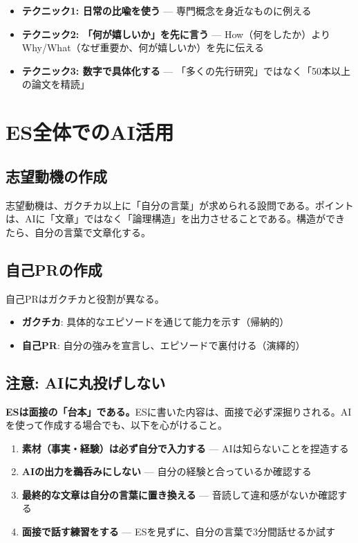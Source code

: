 \begin{itemize}
\item \textbf{テクニック1: 日常の比喩を使う} --- 専門概念を身近なものに例える
\item \textbf{テクニック2: 「何が嬉しいか」を先に言う} --- How（何をしたか）よりWhy/What（なぜ重要か、何が嬉しいか）を先に伝える
\item \textbf{テクニック3: 数字で具体化する} --- 「多くの先行研究」ではなく「50本以上の論文を精読」
\end{itemize}

\section{ES全体でのAI活用}

\subsection*{志望動機の作成}

志望動機は、ガクチカ以上に「自分の言葉」が求められる設問である。ポイントは、AIに「文章」ではなく「論理構造」を出力させることである。構造ができたら、自分の言葉で文章化する。

\subsection*{自己PRの作成}

自己PRはガクチカと役割が異なる。

\begin{itemize}
\item \textbf{ガクチカ}: 具体的なエピソードを通じて能力を示す（帰納的）
\item \textbf{自己PR}: 自分の強みを宣言し、エピソードで裏付ける（演繹的）
\end{itemize}

\subsection*{注意: AIに丸投げしない}

\textbf{ESは面接の「台本」である。}ESに書いた内容は、面接で必ず深掘りされる。AIを使って作成する場合でも、以下を心がけること。

\begin{enumerate}
\item \textbf{素材（事実・経験）は必ず自分で入力する} --- AIは知らないことを捏造する
\item \textbf{AIの出力を鵜呑みにしない} --- 自分の経験と合っているか確認する
\item \textbf{最終的な文章は自分の言葉に置き換える} --- 音読して違和感がないか確認する
\item \textbf{面接で話す練習をする} --- ESを見ずに、自分の言葉で3分間話せるか試す
\end{enumerate}

